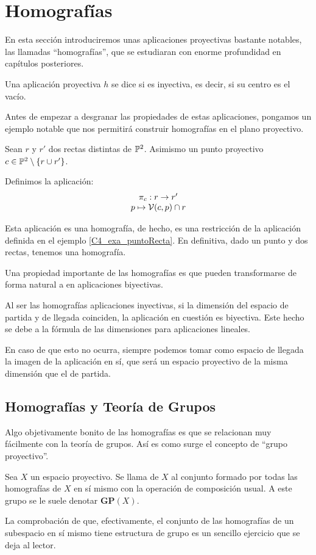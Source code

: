 \section{Homografías}
En esta sección introduciremos unas aplicaciones proyectivas bastante notables, las llamadas ``homografías'', que se estudiaran con enorme profundidad en capítulos posteriores.
\begin{defi}[Homografía]
	\label{C4_def_homografia}
	Una aplicación proyectiva $h$ se dice  si es inyectiva, es decir, si su centro es el vacío.
\end{defi}
Antes de empezar a desgranar las propiedades de estas aplicaciones, pongamos un ejemplo notable que nos permitirá construir homografías en el plano proyectivo.
\begin{exa}
	Sean $r$ y $r'$ dos rectas distintas de $\mathbb{P}^2$. Asimismo un punto proyectivo $c\in\mathbb{P}^2\setminus\{r\cup r'\}$.
	
	Definimos la aplicación: \[\begin{array}{c}
	\pi_c:r\to r'\\
	p\mapsto \mathcal{V}(c,p)\cap r
	\end{array}\]
	
	Esta aplicación es una homografía, de hecho, es una restricción de la aplicación definida en el ejemplo \ref{C4_exa_puntoRecta}. En definitiva, dado un punto y dos rectas, tenemos una homografía.
\end{exa}

Una propiedad importante de las homografías es que pueden transformarse de forma natural a en aplicaciones biyectivas.
\begin{obs}
	Al ser las homografías aplicaciones inyectivas, si la dimensión del espacio de partida y de llegada coinciden, la aplicación en cuestión es biyectiva. Este hecho se debe a la fórmula de las dimensiones para aplicaciones lineales.
	
	En caso de que esto no ocurra, siempre podemos tomar como espacio de llegada la imagen de la aplicación en sí, que será un espacio proyectivo de la misma dimensión que el de partida.
\end{obs}

\subsection{Homografías y Teoría de Grupos}
Algo objetivamente bonito de las homografías es que se relacionan muy fácilmente con la teoría de grupos. Así es como surge el concepto de ``grupo proyectivo''.
\begin{defi}
	Sea $X$ un espacio proyectivo. Se llama  de $X$ al conjunto formado por todas las homografías de $X$ en sí mismo con la operación de composición usual. A este grupo se le suele denotar $\mathbf{GP}(X)$.
\end{defi}
La comprobación de que, efectivamente, el conjunto de las homografías de un subespacio en sí mismo tiene estructura de grupo es un sencillo ejercicio que se deja al lector.


